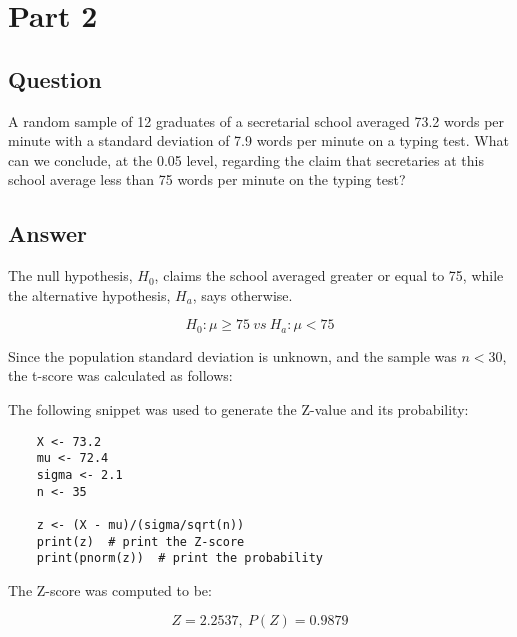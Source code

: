 \section{Part 2}
    \subsection{Question}
    A random sample of 12 graduates of a secretarial school averaged 73.2 words per minute with a standard deviation of 7.9 words per minute on a typing test. What can we conclude, at the 0.05 level, regarding the claim that secretaries at this school average less than 75 words per minute on the typing test?

    \subsection{Answer}
    The null hypothesis, $H_{0}$, claims the school averaged greater or equal to 75, while the alternative hypothesis, $H_{a}$, says otherwise.

        \[ H_{0}: \mu \geq 75 \ vs \ H_{a}: \mu < 75 \]

    Since the population standard deviation is unknown, and the sample was $n < 30$, the t-score was calculated as follows:

        

    The following snippet was used to generate the Z-value and its probability:
\begin{lstlisting}
    X <- 73.2
    mu <- 72.4
    sigma <- 2.1
    n <- 35

    z <- (X - mu)/(sigma/sqrt(n))
    print(z)  # print the Z-score
    print(pnorm(z))  # print the probability
\end{lstlisting}

    The Z-score was computed to be:

        \[ Z=2.2537, \ P(Z) =0.9879 \]
